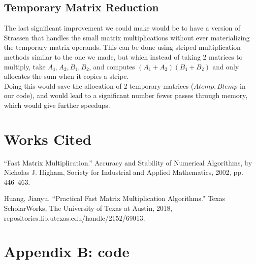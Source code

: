 \documentclass{article}         %
\begin{document}
\subsection*{Temporary Matrix Reduction}
The last significant improvement we could make would be to have a version of Strassen that handles the small matrix multiplications without ever materializing the temporary matrix operands. This can be done using striped multiplication methods similar to the one we made, but which instead of taking 2 matrices to multiply, take $A_1,A_2,B_1,B_2$, and computes $(A_1+A_2)(B_1+B_2)$ and only allocates the sum when it copies a stripe.\\ Doing this would save the allocation of 2 temporary matrices ($Atemp, Btemp$ in our code), and would lead to a significant number fewer passes through memory, which would give further speedups.

\newpage
\section*{Works Cited}

“Fast Matrix Multiplication.” Accuracy and Stability of Numerical Algorithms, by Nicholas J. Higham, Society for Industrial and Applied Mathematics, 2002, pp. 446–463.

Huang, Jianyu. “Practical Fast Matrix Multiplication Algorithms.” Texas ScholarWorks, The University of Texas at Austin, 2018, repositories.lib.utexas.edu/handle/2152/69013.
\newpage
\section*{Appendix B: code}

\end{document}

